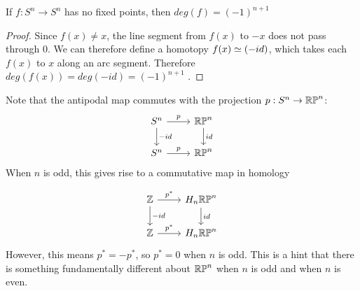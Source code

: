 \begin{corollary}\label{fixed-points}
If $f:S^n\rightarrow S^n$ has no fixed points, then $deg(f)=(-1)^{n+1}$
\end{corollary}
\begin{proof}
Since $f(x)\neq x$, the line segment from $f(x)$ to $-x$ does not pass through $0$. We can therefore define a homotopy $f(x)\simeq (-id)$, which takes each $f(x)$ to $x$ along an arc segment. Therefore $deg(f(x))=deg(-id)=(-1)^{n+1}$ \cite{Hatcher}.
\end{proof}

\begin{remark}
Note that the antipodal map commutes with the projection $p:S^n\rightarrow \mathbb{RP}^{n}$:
\[\begin{tikzcd}
S^n \arrow[r, "p"] \arrow[d, "-id"] & \RP{n} \arrow[d, "id"] \\
S^n \arrow[r, "p"]                    & \RP{n}                
\end{tikzcd}\]
When $n$ is odd, this gives rise to a commutative map in homology

\[\begin{tikzcd}
\mathbb{Z} \arrow[r, "p^*"] \arrow[d, "-id"] & H_n\RP{n} \arrow[d, "id"] \\
\mathbb{Z} \arrow[r, "p^*"]                 & H_n\RP{n}                
\end{tikzcd}\]
However, this means $p^*=-p^*$, so $p^*=0$ when $n$ is odd. This is a hint that there is something fundamentally different about $\mathbb{RP}^{n}$ when $n$ is odd and when $n$ is even. 
\end{remark}

